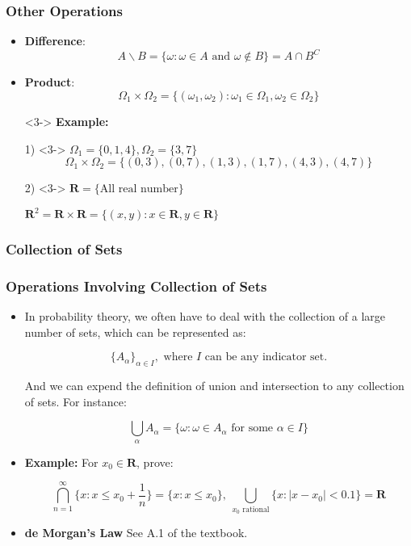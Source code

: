 \documentclass[handout]{beamer}
\begin{document}
\frame
{
  \frametitle{Other Operations}

\begin{itemize}
\item<1-> \textbf{Difference}: 
$$A \backslash  B=\{\omega: \omega\in A \text{ and } \omega \not\in B\}=A\cap B^C$$
\item<2-> \textbf{Product}: 
$$\Omega_1 \times \Omega_2=\{(\omega_1,\omega_2): \omega_1\in \Omega_1, \omega_2\in \Omega_2 \}$$

\item [] <3-> \textbf{Example:} 

\item [1)]<3-> $\Omega_1=\{0,1,4\}, \Omega_2=\{3,7\}$
$$\Omega_1 \times \Omega_2=\{ (0,3), (0,7), (1,3), (1,7),(4,3), (4,7) \}$$

\item [2)]<3->   $\mathbf{R}=\{\text{All real number}\}$

 $\mathbf{R}^2=\mathbf{R} \times \mathbf{R}=\{(x,y): x\in \mathbf{R}, y\in \mathbf{R}\}$

\end{itemize}

}


\subsubsection{Collection of Sets}
\frame
{
  \frametitle{Operations Involving Collection of Sets }

\begin{itemize}
\item<1-> In probability theory, we often have to deal with the collection of a large number of sets, which can be represented as:

$$ \{A_\alpha\}_{\alpha\in I}, \text{ where } I \text{ can be any indicator set.}$$

And we can expend the definition of union and intersection to any collection of sets. For instance:

$$ \bigcup_\alpha A_\alpha=\{\omega: \omega \in A_\alpha \text{ for some } \alpha \in I\}$$


\item<2-> \textbf{Example:} For  $x_0\in \mathbf{R}$, prove:

$$\bigcap_{n=1}^{\infty} \{x: x\leq x_0+\frac{1}{n}\}=\{x:x\leq x_0 \},\ \bigcup_{x_0 \text{ rational}} \{x: |x-x_0|<0.1\}=\mathbf{R}$$

\item<3-> \textbf{de Morgan's Law} See A.1 of the textbook.

\end{itemize}

}
\end{document}
